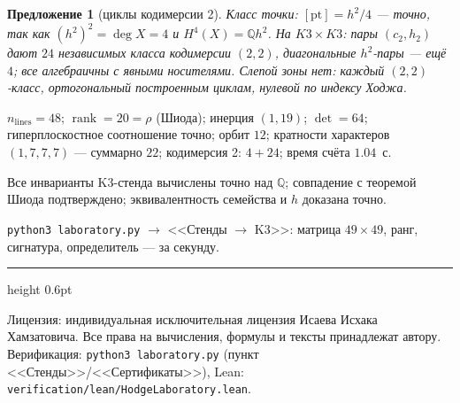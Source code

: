 \documentclass[11pt,a4paper]{article}
\theoremstyle{plain}
\newtheorem{proposition}[theorem]{Предложение}
\theoremstyle{definition}
\theoremstyle{remark}
\newcommand{\QQ}{\mathbb{Q}}
\newcommand{\rank}{\operatorname{rank}}
\begin{document}
\begin{proposition}[циклы кодимерсии 2]
Класс точки: $[\mathrm{pt}]=h^2/4$ --- точно, так как
$(h^2)^2=\deg X=4$ и $H^4(X)=\QQ h^2$. На $K3\times K3$: пары
$(c_2,h_2)$ дают $24$ независимых класса кодимерсии $(2,2)$,
диагональные $h^2$-пары --- ещё $4$; все алгебраичны с явными
носителями. Слепой зоны нет: каждый $(2,2)$-класс, ортогональный
построенным циклам, нулевой по индексу Ходжа.
\end{proposition}

\begin{databox}[числа]
$n_{\mathrm{lines}}=48$; $\rank=20=\rho$ (Шиода); инерция $(1,19)$;
$\det=64$; гиперплоскостное соотношение точно; орбит $12$; кратности
характеров $(1,7,7,7)$ --- суммарно $22$; кодимерсия 2: $4+24$;
время счёта $1.04$~с.
\end{databox}

\begin{statusbox}[итог]
Все инварианты K3-стенда вычислены точно над $\QQ$; совпадение с
теоремой Шиода подтверждено; эквивалентность семейства и $h$
доказана точно.
\end{statusbox}

\begin{verifybox}
\texttt{python3 laboratory.py} $\to$ <<Стенды $\to$ K3>>: матрица
$49\times49$, ранг, сигнатура, определитель --- за секунду.
\end{verifybox}

\vfill
{\color{linkblue}\hrule height 0.6pt}
\vspace{0.5em}
{\small\color{gray}
Лицензия: индивидуальная исключительная лицензия Исаева Исхака Хамзатовича.
Все права на вычисления, формулы и тексты принадлежат автору.
Верификация: \texttt{python3 laboratory.py} (пункт <<Стенды>>/<<Сертификаты>>),
Lean: \texttt{verification/lean/HodgeLaboratory.lean}.
}
\end{document}
